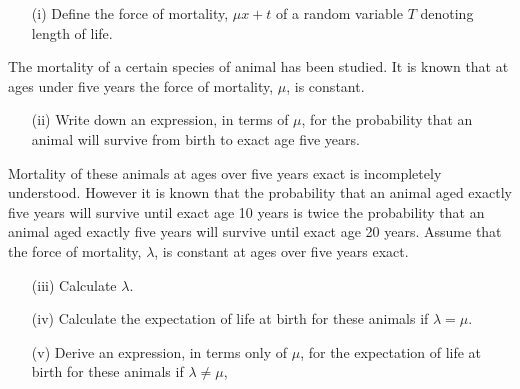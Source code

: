 \documentclass[a4paper,12pt]{article}
\begin{document}
\begin{itemize} 
\item[(i)] Define the force of mortality, $\mu x+t$ of a random variable $T$ denoting length of
life. 
\end{itemize}
The mortality of a certain species of animal has been studied. It is known that at ages
under five years the force of mortality, $\mu$, is constant.
\begin{itemize} 
\item[(ii)] Write down an expression, in terms of $\mu$, for the probability that an animal
will survive from birth to exact age five years. 
\end{itemize}

Mortality of these animals at ages over five years exact is incompletely understood.
However it is known that the probability that an animal aged exactly five years will
survive until exact age 10 years is twice the probability that an animal aged exactly
five years will survive until exact age 20 years.
Assume that the force of mortality, $\lambda$, is constant at ages over five years exact.
\begin{itemize} 
\item[(iii)] Calculate $\lambda$. 
\item[(iv)] Calculate the expectation of life at birth for these animals if $\lambda = \mu$. 
\item[(v)] Derive an expression, in terms only of $\mu$, for the expectation of life at birth for
these animals if $\lambda ≠ \mu$, 
\end{itemize}
\end{document}
